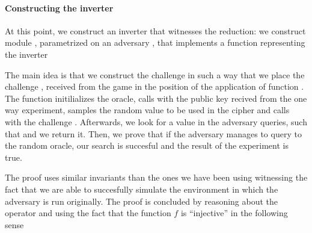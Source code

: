 \paragraph{Constructing the inverter}
At this point, we construct an inverter that witnesses the reduction:
we construct module , parametrized on an adversary ,
that implements a function  representing the inverter

The main idea is that we construct the challenge  in such a way
that we place the challenge , received from the  game in
the position of the application of function . The function
initilializes the oracle, calls  with the public key 
recived from the one way experiment, samples the random value 
to be used in the cipher and calls  with the challenge . Afterwards, we look for a value  in the adversary queries,
such that  and we return it. Then, we prove that if the
adversary manages to query  to the random oracle, our search
is succesful and the result of the  experiment is true. 


The proof uses similar invariants than the ones we have been using
witnessing the fact that we are able to succesfully simulate the
environment in which the adversary  is run originally. The proof
is concluded by reasoning about the  operator and using the
fact that the function $f$ is ``injective'' in the following sense





